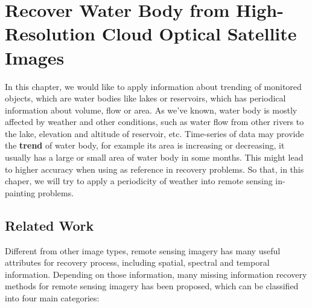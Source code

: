 \chapter{Recover Water Body from High-Resolution Cloud Optical Satellite Images}
\label{chap-3-recover-water-body}
\begin{ChapAbstract}

In this chapter, we would like to apply information about trending of monitored objects, which are water bodies like lakes or reservoirs, which has periodical information about volume, flow or area. As we've known, water body is mostly affected by weather and other conditions, such as water flow from other rivers to the lake, elevation and altitude of reservoir, etc. Time-series of data may provide the \textbf{trend} of water body, for example its area is increasing or decreasing, it usually has a large or small area of water body in some months. This might lead to higher accuracy when using as reference in recovery problems. So that, in this chaper, we will try to apply a periodicity of weather into remote sensing in-painting problems.

\end{ChapAbstract}

\section{Related Work}

Different from other image types, remote sensing imagery has many useful attributes for recovery process, including spatial, spectral and temporal information. Depending on those information, many missing information recovery methods for remote sensing imagery has been proposed, which can be classified into four main categories: 

